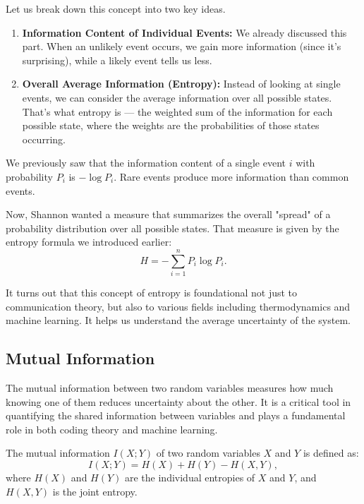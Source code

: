 \documentclass[12pt,a4paper]{article}
\newenvironment{defbox}[1][]{%
  \begin{tcolorbox}[enhanced, breakable, colback=defcolor, colframe=green!50!black, title=#1, fonttitle=\bfseries, arc=3pt, boxrule=0.5pt]
}{\end{tcolorbox}}
\newenvironment{rembox}[1][]{%
  \begin{tcolorbox}[enhanced, breakable, colback=gray!5, colframe=gray!50, title=#1, fonttitle=\bfseries, arc=3pt, boxrule=0.5pt]
}{\end{tcolorbox}}
\begin{document}
Let us break down this concept into two key ideas.

\begin{enumerate}
    \item \textbf{Information Content of Individual Events:} We already discussed this part. When an unlikely event occurs, we gain more information (since it's surprising), while a likely event tells us less.
    
    \item \textbf{Overall Average Information (Entropy):} Instead of looking at single events, we can consider the average information over all possible states. That’s what entropy is — the weighted sum of the information for each possible state, where the weights are the probabilities of those states occurring.
\end{enumerate}

\begin{rembox}[Recap on Individual Event Information]
We previously saw that the information content of a single event $i$ with probability $P_i$ is \(-\log P_i\). Rare events produce more information than common events.
\end{rembox}

Now, Shannon wanted a measure that summarizes the overall "spread" of a probability distribution over all possible states. That measure is given by the entropy formula we introduced earlier:
\[
H = - \sum_{i=1}^n P_i \log P_i.
\]

It turns out that this concept of entropy is foundational not just to communication theory, but also to various fields including thermodynamics and machine learning. It helps us understand the average uncertainty of the system.
\subsection{Mutual Information}

The mutual information between two random variables measures how much knowing one of them reduces uncertainty about the other. It is a critical tool in quantifying the shared information between variables and plays a fundamental role in both coding theory and machine learning.

\begin{defbox}[Definition of Mutual Information]
The mutual information \( I(X;Y) \) of two random variables \( X \) and \( Y \) is defined as:
\[
I(X;Y) = H(X) + H(Y) - H(X,Y),
\]
where \( H(X) \) and \( H(Y) \) are the individual entropies of \( X \) and \( Y \), and \( H(X,Y) \) is the joint entropy.
\end{defbox}
\end{document}
